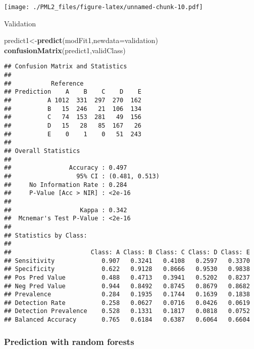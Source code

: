 \documentclass[]{article}
\newenvironment{Shaded}{\begin{snugshade}}{\end{snugshade}}
\newcommand{\KeywordTok}[1]{\textcolor[rgb]{0.13,0.29,0.53}{\textbf{{#1}}}}
\newcommand{\DataTypeTok}[1]{\textcolor[rgb]{0.13,0.29,0.53}{{#1}}}
\newcommand{\DecValTok}[1]{\textcolor[rgb]{0.00,0.00,0.81}{{#1}}}
\newcommand{\NormalTok}[1]{{#1}}
\begin{document}
\texttt{[image: ./PML2\_files/figure-latex/unnamed-chunk-10.pdf]}

Validation

\begin{Shaded}
\begin{Highlighting}[]
\NormalTok{predict1<-}\KeywordTok{predict}\NormalTok{(modFit1,}\DataTypeTok{newdata=}\NormalTok{validation)}
\KeywordTok{confusionMatrix}\NormalTok{(predict1,validClass)}
\end{Highlighting}
\end{Shaded}

\begin{verbatim}
## Confusion Matrix and Statistics
## 
##           Reference
## Prediction    A    B    C    D    E
##          A 1012  331  297  270  162
##          B   15  246   21  106  134
##          C   74  153  281   49  156
##          D   15   28   85  167   26
##          E    0    1    0   51  243
## 
## Overall Statistics
##                                         
##                Accuracy : 0.497         
##                  95% CI : (0.481, 0.513)
##     No Information Rate : 0.284         
##     P-Value [Acc > NIR] : <2e-16        
##                                         
##                   Kappa : 0.342         
##  Mcnemar's Test P-Value : <2e-16        
## 
## Statistics by Class:
## 
##                      Class: A Class: B Class: C Class: D Class: E
## Sensitivity             0.907   0.3241   0.4108   0.2597   0.3370
## Specificity             0.622   0.9128   0.8666   0.9530   0.9838
## Pos Pred Value          0.488   0.4713   0.3941   0.5202   0.8237
## Neg Pred Value          0.944   0.8492   0.8745   0.8679   0.8682
## Prevalence              0.284   0.1935   0.1744   0.1639   0.1838
## Detection Rate          0.258   0.0627   0.0716   0.0426   0.0619
## Detection Prevalence    0.528   0.1331   0.1817   0.0818   0.0752
## Balanced Accuracy       0.765   0.6184   0.6387   0.6064   0.6604
\end{verbatim}

\begin{Shaded}
\end{Shaded}

\subsubsection{Prediction with random
forests}\label{prediction-with-random-forests}
\end{document}
